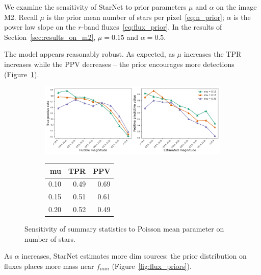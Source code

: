 We examine the sensitivity of StarNet to prior parameters $\mu$ and $\alpha$ on the image M2. 
Recall $\mu$ is the prior mean number of stars per pixel~\eqref{eq:n_prior};
$\alpha$ is the power law slope on the $r$-band fluxes~\eqref{eq:flux_prior}. 
In the results of Section~\ref{sec:results_on_m2}, $\mu=0.15$ and  $\alpha = 0.5$. 

The model appears reasonably robust. 
As expected, as $\mu$ increases the TPR increases while the PPV decreases  -- the prior encourages more detections (Figure~\ref{fig:mu_sensitivity}). 

\begin{figure}[ht]
\begin{subfigure}{\textwidth}
\centering
\includegraphics[width = \textwidth]{figures/prior_mu_sensitivty.png}
\end{subfigure}
\begin{subfigure}{\textwidth}
\begin{center}
\begin{tabular}{rrr}
\toprule
     mu &   TPR &   PPV \\
\midrule
 0.10 &  0.49 &  0.69 \\
 0.15 &  0.51 &  0.61 \\
 0.20 &  0.52 &  0.49 \\
\bottomrule
\end{tabular}
\par\vspace{0pt}
\end{center}
\end{subfigure}\hfill
\caption{Sensitivity of summary statistics to Poisson mean parameter on number of stars. }
\label{fig:mu_sensitivity}
\end{figure}

As $\alpha$ increases, StarNet estimates more dim sources: the prior distribution on fluxes places more mass near $f_{min}$ (Figure~\ref{fig:flux_priors}). 

